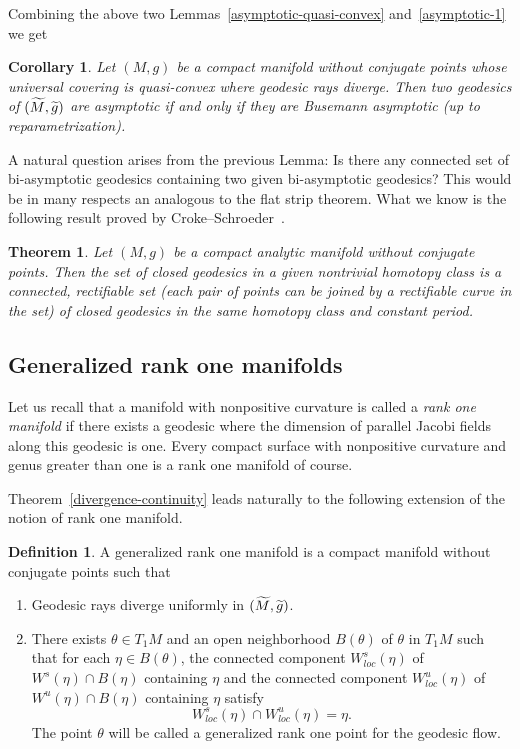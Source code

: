\documentclass[10pt]{amsart}
\newtheorem{theo}[cdrthm]{Theorem}
\newtheorem{coro}[cdrthm]{Corollary}
\theoremstyle{definition}
\newtheorem{defi}[cdrthm]{Definition}
\let\oldtilde\tilde
\renewcommand*{\tilde}[1]{\mathchoice{\widetilde{#1}}{\widetilde{#1}}{\oldtilde{#1}}{\oldtilde{#1}}}
\begin{document}
\pagebreak
Combining the above two Lemmas~\ref{asymptotic-quasi-convex} and~\ref{asymptotic-1} we get

\begin{coro}\label{asympt-unique}
Let $(M,g)$ be a compact manifold without conjugate points whose universal covering is quasi-convex where geodesic rays diverge. Then two geodesics of $(\tilde{M}, \tilde{g})$ are asymptotic if and only if they are Busemann asymptotic (up to reparametrization).
\end{coro}

A natural question arises from the previous Lemma: Is there any connected set of bi-asymptotic geodesics containing two given bi-asymptotic geodesics? This would be in many respects an analogous to the flat strip theorem. What we know is the following result proved by Croke--Schroeder~\cite{kn:CS}.

\begin{theo}\label{CS}
Let $(M,g)$ be a compact analytic manifold without conjugate points. Then the set of closed geodesics in a given nontrivial homotopy class is a connected, rectifiable set (each pair of points can be joined by a rectifiable curve in the set) of closed geodesics in the same homotopy class and constant period.
\end{theo}

\subsection{Generalized rank one manifolds}

Let us recall that a manifold with nonpositive curvature is called a \emph{rank one manifold} if there exists a geodesic where the dimension of parallel Jacobi fields along this geodesic is one. Every compact surface with nonpositive curvature and genus greater than one is a rank one manifold of course.

Theorem~\ref{divergence-continuity} leads naturally to the following extension of the notion of rank one manifold.

\begin{defi}\label{DEFgenrankone}
A generalized rank one manifold is a compact manifold without conjugate points such that
\begin{enumerate}
\item  \label{defi2.13.1}Geodesic rays diverge uniformly in $(\tilde{M}, \tilde{g})$.
\item \label{defi2.13.2}There exists $\theta \in T_{1}M$ and an open neighborhood $B(\theta)$ of $\theta$ in $T_1M$ such that for each $\eta \in B(\theta)$, the connected component $W^{s}_{loc}(\eta)$ of $W^{s}(\eta) \cap B(\eta)$ containing $\eta$ and the connected component $W^{u}_{loc}(\eta)$ of $W^{u}(\eta) \cap B(\eta)$ containing $\eta$ satisfy
\[
W^{s}_{loc}(\eta) \cap W^{u}_{loc}(\eta) = \eta.
\]
The point $\theta$ will be called a generalized rank one point for the geodesic flow.
\end{enumerate}
\end{defi}
\end{document}
